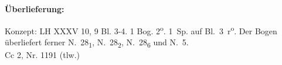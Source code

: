 \begin{ledgroupsized}[r]{120mm}
\footnotesize 
\pstart 
\noindent\textbf{\"{U}berlieferung:}
\pend
\end{ledgroupsized}
\begin{ledgroupsized}[r]{114mm}
\footnotesize 
\pstart \parindent -6mm
%
Konzept: LH XXXV 10, 9 Bl. 3-4. 1 Bog. 2\textsuperscript{o}. 1\, Sp. auf Bl.~3~r\textsuperscript{o}.
Der Bogen überliefert ferner N.~28\textsubscript{1}, N.~28\textsubscript{2}, N.~28\textsubscript{6} und N.~5.
\\
Cc 2, Nr. 1191 (tlw.)
\pend
\end{ledgroupsized}

 
